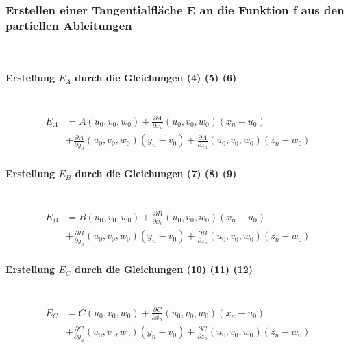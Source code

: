 \subsubsection{Erstellen einer Tangentialfläche E an die Funktion f aus den partiellen Ableitungen} \ \\

\paragraph{Erstellung $E_{A}$ durch die Gleichungen (4) (5) (6)} \ \\
\begin{align}
\begin{split}
E_{A} &= A(u_{0},v_{0},w_{0}) + \frac{\partial A}{\partial x_{n}}(u_{0},v_{0},w_{0})(x_{n} - u_{0}) \\ &+ \frac{\partial A}{\partial y_{n}}(u_{0},v_{0},w_{0})(y_{n} - v_{0}) + \frac{\partial A}{\partial z_{n}}(u_{0},v_{0},w_{0})(z_{n} - w_{0})
\end{split}
\end{align}
\paragraph{Erstellung $E_{B}$ durch die Gleichungen (7) (8) (9)} \ \\
\begin{align}
\begin{split}
E_{B} &= B(u_{0},v_{0},w_{0}) + \frac{\partial B}{\partial x_{n}}(u_{0},v_{0},w_{0})(x_{n} - u_{0}) \\ &+ \frac{\partial B}{\partial y_{n}}(u_{0},v_{0},w_{0})(y_{n} - v_{0}) + \frac{\partial B}{\partial z_{n}}(u_{0},v_{0},w_{0})(z_{n} - w_{0})
\end{split}
\end{align}

\paragraph{Erstellung $E_{C}$ durch die Gleichungen (10) (11) (12)} \ \\
\begin{align}
\begin{split}
E_{C} &= C(u_{0},v_{0},w_{0}) + \frac{\partial C}{\partial x_{n}}(u_{0},v_{0},w_{0})(x_{n} - u_{0}) \\ &+ \frac{\partial C}{\partial y_{n}}(u_{0},v_{0},w_{0})(y_{n} - v_{0}) + \frac{\partial C}{\partial z_{n}}(u_{0},v_{0},w_{0})(z_{n} - w_{0})
\end{split}
\end{align} \ \\


